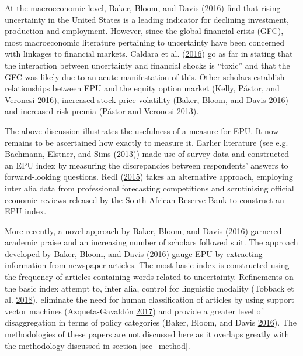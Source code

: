 \documentclass[11pt,preprint, authoryear]{elsarticle}
\numberwithin{equation}{section}
\numberwithin{figure}{section}
\numberwithin{table}{section}
\begin{document}
At the macroeconomic level, Baker, Bloom, and Davis
(\protect\hyperlink{ref-Baker2016}{2016}) find that rising uncertainty
in the United States is a leading indicator for declining investment,
production and employment. However, since the global financial crisis
(GFC), most macroeconomic literature pertaining to uncertainty have been
concerned with linkages to financial markets. Caldara et al.
(\protect\hyperlink{ref-Caldara2016}{2016}) go as far in stating that
the interaction between uncertainty and financial shocks is ``toxic''
and that the GFC was likely due to an acute manifestation of this. Other
scholars establish relationships between EPU and the equity option
market (Kelly, Pástor, and Veronesi
\protect\hyperlink{ref-Kelly2016}{2016}), increased stock price
volatility (Baker, Bloom, and Davis
\protect\hyperlink{ref-Baker2016}{2016}) and increased risk premia
(Pástor and Veronesi \protect\hyperlink{ref-Pastor2013}{2013}).

The above discussion illustrates the usefulness of a measure for EPU. It
now remains to be ascertained how exactly to measure it. Earlier
literature (see e.g. Bachmann, Elstner, and Sims
(\protect\hyperlink{ref-Bachmann2013}{2013})) made use of survey data
and constructed an EPU index by measuring the discrepancies between
respondents' answers to forward-looking questions. Redl
(\protect\hyperlink{ref-Redl2015}{2015}) takes an alternative approach,
employing inter alia data from professional forecasting competitions and
scrutinising official economic reviews released by the South African
Reserve Bank to construct an EPU index.

More recently, a novel approach by Baker, Bloom, and Davis
(\protect\hyperlink{ref-Baker2016}{2016}) garnered academic praise and
an increasing number of scholars followed suit. The approach developed
by Baker, Bloom, and Davis (\protect\hyperlink{ref-Baker2016}{2016})
gauge EPU by extracting information from newspaper articles. The most
basic index is constructed using the frequency of articles containing
words related to uncertainty. Refinements on the basic index attempt to,
inter alia, control for linguistic modality (Tobback et al.
\protect\hyperlink{ref-Tobback2018}{2018}), eliminate the need for human
classification of articles by using support vector machines
(Azqueta-Gavaldón \protect\hyperlink{ref-Azqueta-Gavaldon2017}{2017})
and provide a greater level of disaggregation in terms of policy
categories (Baker, Bloom, and Davis
\protect\hyperlink{ref-Baker2016}{2016}). The methodologies of these
papers are not discussed here as it overlaps greatly with the
methodology discussed in section \ref{sec_method}.
\end{document}
